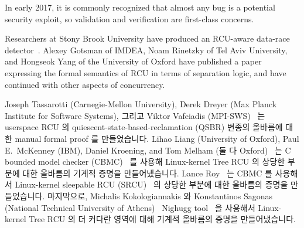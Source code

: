 In early 2017, it is commonly recognized that almost any bug is a potential
security exploit, so validation and verification are first-class concerns.

Researchers at Stony Brook University have produced an RCU-aware data-race
detector~\cite{AbhinavDuggal2010Masters,JustinSeyster2012PhD,Seyster:2011:RFA:2075416.2075425}.
Alexey Gotsman of IMDEA, Noam Rinetzky of Tel Aviv University,
and Hongseok Yang of the University of Oxford have published a
paper~\cite{AlexeyGotsman2012VerifyGraceExtended} expressing the formal
semantics of RCU in terms of separation logic, and have continued with
other aspects of concurrency.
\fi

Joseph Tassarotti (Carnegie-Mellon University), Derek Dreyer (Max
Planck Institute for Software Systems), 그리고 Viktor Vafeiadis
(MPI-SWS)~\cite{JosephTassarotti2015RCUproof} 는 userspace RCU 의
quiescent-state-based-reclamation (QSBR) 변종의 올바름에 대한 manual formal
proof 를 만들었습니다.
Lihao Liang (University of Oxford), Paul E.~McKenney (IBM),
Daniel Kroening, and Tom Melham
(둘 다 Oxford)~\cite{LihaoLiang2016VerifyTreeRCU} 는 C bounded model checker
(CBMC)~\cite{EdmundClarke2004CBMC} 를 사용해 Linux-kernel Tree RCU 의 상당한
부분에 대한 올바름의 기계적 증명을 만들어냈습니다.
Lance Roy~\cite{LanceRoy2017CBMC-SRCU} 는 CBMC 를 사용해서 Linux-kernel
sleepable RCU (SRCU)~\cite{PaulEMcKenney2006c} 의 상당한 부분에 대한 올바름의
증명을 만들었습니다.
마지막으로, Michalis Kokologiannakis 와 Konstantinos Sagonas (National
Technical University of Athens)~\cite{MichalisKokologiannakis2017NidhuggRCU}
Nighugg tool~\cite{CarlLeonardsson2014Nidhugg} 을 사용해서 Linux-kernel Tree
RCU 의 더 커다란 영역에 대해 기계적 올바름의 증명을 만들어냈습니다.
\iffalse

Joseph Tassarotti (Carnegie-Mellon University), Derek Dreyer (Max
Planck Institute for Software Systems), and Viktor Vafeiadis
(also MPI-SWS)~\cite{JosephTassarotti2015RCUproof}
produced a manual formal proof of correctness of the quiescent-state-based
reclamation (QSBR) variant of userspace
RCU~\cite{MathieuDesnoyers2009URCU,MathieuDesnoyers2012URCU}.
Lihao Liang (University of Oxford), Paul E.~McKenney (IBM),
Daniel Kroening, and Tom Melham
(both also Oxford)~\cite{LihaoLiang2016VerifyTreeRCU}
used the C bounded model checker (CBMC)~\cite{EdmundClarke2004CBMC}
to produce a mechanical proof of correctness of a significant portion
of Linux-kernel Tree RCU.
Lance Roy~\cite{LanceRoy2017CBMC-SRCU} used CBMC to produce a similar
proof of correctness for a significant portion of Linux-kernel
sleepable RCU (SRCU)~\cite{PaulEMcKenney2006c}.
Finally, Michalis Kokologiannakis and Konstantinos Sagonas (National Technical University of
Athens)~\cite{MichalisKokologiannakis2017NidhuggRCU}
used the Nighugg tool~\cite{CarlLeonardsson2014Nidhugg}
to produce a mechanical proof of correctness of a somewhat larger
portion of Linux-kernel Tree RCU.
\fi

